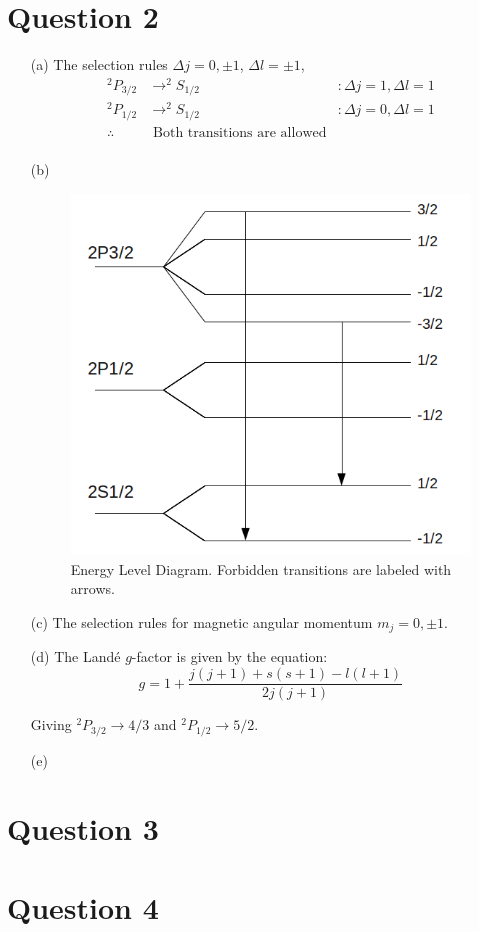\documentclass[10pt,a4paper]{article}
\begin{document}
\section*{Question 2}
\begin{itemize}
	\item[(a)] The selection rules $\Delta j = 0, \pm 1$, $\Delta l = \pm 1$,
		\begin{align*}
			^{2}P_{3/2} &\rightarrow ^{2}S_{1/2} &: \Delta j = 1, \Delta l = 1  \\
			^{2}P_{1/2} &\rightarrow ^{2}S_{1/2} &: \Delta j = 0, \Delta l = 1  \\
			\therefore &\mbox{ Both transitions are allowed}& \\
		\end{align*}
	
	\item[(b)] 
		\begin{figure}[!h]
			\begin{center}
				\includegraphics[width=0.8\linewidth]{energyLevels.png}
			\end{center}
			\caption{Energy Level Diagram. Forbidden transitions are labeled with arrows.}
		\end{figure}

	\item[(c)] The selection rules for magnetic angular momentum $m_{j} = 0, \pm 1$.

	\item[(d)] The Land\' e $g$-factor is given by the equation:
		\begin{equation*}
			g = 1 + \frac{j(j+1)+s(s+1)-l(l+1)}{2j(j+1)}
		\end{equation*}
	
	Giving $^{2}P_{3/2} \rightarrow 4/3$ and $^{2}P_{1/2} \rightarrow 5/2$.

	\item[(e)]
\end{itemize}

\section*{Question 3}
\section*{Question 4}
\end{document}
